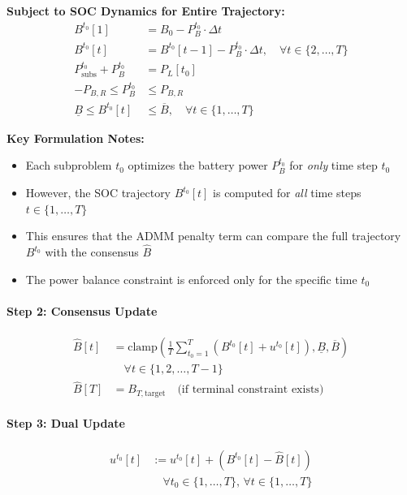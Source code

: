 \textbf{Subject to SOC Dynamics for Entire Trajectory:}
\begin{align}
B^{t_0}[1] &= B_0 - P_{B}^{t_0} \cdot \Delta t \\
B^{t_0}[t] &= B^{t_0}[t-1] - P_{B}^{t_0} \cdot \Delta t, \quad \forall t \in \{2, \ldots, T\} \\
P_{\text{subs}}^{t_0} + P_{B}^{t_0} &= P_L[t_0] \\
-P_{B,R} \leq P_{B}^{t_0} &\leq P_{B,R} \\
\underline{B} \leq B^{t_0}[t] &\leq \overline{B}, \quad \forall t \in \{1, \ldots, T\}
\end{align}

\textbf{Key Formulation Notes:}
\begin{itemize}
    \item Each subproblem $t_0$ optimizes the battery power $P_{B}^{t_0}$ for \textit{only} time step $t_0$
    \item However, the SOC trajectory $B^{t_0}[t]$ is computed for \textit{all} time steps $t \in \{1, \ldots, T\}$
    \item This ensures that the ADMM penalty term can compare the full trajectory $B^{t_0}$ with the consensus $\hat{B}$
    \item The power balance constraint is enforced only for the specific time $t_0$
\end{itemize}

\paragraph{Step 2: Consensus Update}
\begin{align}
\hat{B}[t] &= \text{clamp}\left( \frac{1}{T} \sum_{t_0=1}^{T} \left( B^{t_0}[t] + u^{t_0}[t] \right), \underline{B}, \overline{B} \right) \\
&\quad \forall t \in \{1, 2, \ldots, T-1\} \\
\hat{B}[T] &= B_{T,\text{target}} \quad \text{(if terminal constraint exists)}
\end{align}

\paragraph{Step 3: Dual Update}
\begin{align}
u^{t_0}[t] &:= u^{t_0}[t] + \left( B^{t_0}[t] - \hat{B}[t] \right) \\
&\quad \forall t_0 \in \{1, \ldots, T\}, \, \forall t \in \{1, \ldots, T\}
\end{align}

